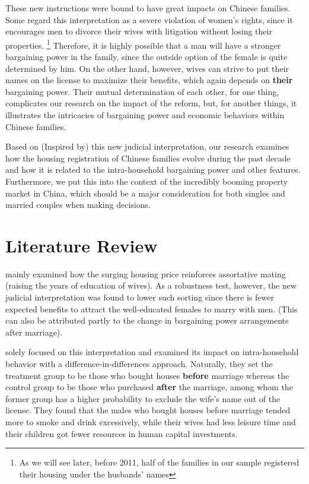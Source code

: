 \documentclass[11pt]{article}
\begin{document}
These new instructions were bound to have great impacts on Chinese families. Some regard this interpretation as a severe violation of women's rights, since it encourages men to divorce their wives with litigation without losing their properties. \footnote{As we will see later, before 2011, half of the families in our sample registered their housing under the husbands' names} Therefore, it is highly possible that a man will have a stronger bargaining power in the family, since the outside option of the female is quite determined by him. On the other hand, however, wives can strive to put their names on the license to maximize their benefits, which again depends on \textbf{their} bargaining power. Their mutual determination of each other, for one thing, complicates our research on the impact of the reform, but, for another things, it illustrates the intricacies of bargaining power and economic behaviors within Chinese families.

Based on (Inspired by) this new judicial interpretation, our research examines how the housing registration of Chinese families evolve during the past decade and how it is related to the intra-household bargaining power and other features. Furthermore, we put this into the context of the incredibly booming property market in China, which should be a major consideration for both singles and married couples when making decisions.

\section{Literature Review} \label{sec:literature}
\citet{SUN2020102492} mainly examined how the surging housing price reinforces assortative mating (raising the years of education of wives). As a robustness test, however, the new judicial interpretation was found to lower such sorting since there is fewer expected benefits to attract the well-educated females to marry with men. (This can also be attributed partly to the change in bargaining power arrangements after marriage).

\citet{WANG2014192} solely focused on this interpretation and examined its impact on intra-household behavior 
with a difference-in-differences approach. Naturally, they set the treatment group to be those who bought houses \textbf{before} marriage whereas the control group to be those who purchased \textbf{after} the marriage, among whom the former group has a higher probability to exclude the wife's name out of the license. They found that the males who bought houses before marriage tended more to smoke and drink excessively, while their wives had less leisure time and their children got fewer resources in human capital investments. 
\end{document}
